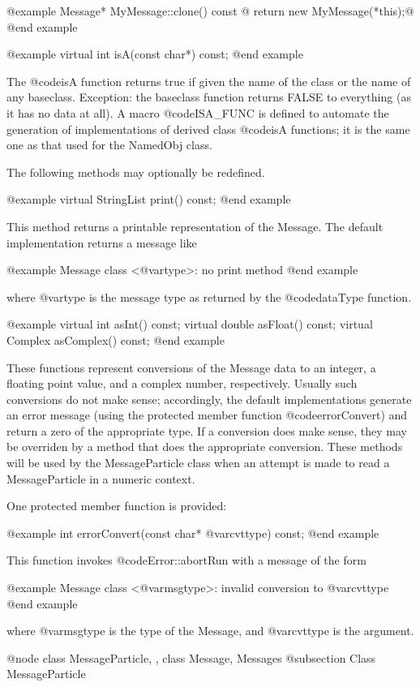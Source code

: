 @example
Message* MyMessage::clone() const @{ return new MyMessage(*this);@}
@end example

@example
virtual int isA(const char*) const;
@end example

The @code{isA} function returns true if given the name of the class
or the name of any baseclass.  Exception: the baseclass function returns
FALSE to everything (as it has no data at all).  A macro @code{ISA_FUNC}
is defined to automate the generation of implementations of derived
class @code{isA} functions; it is the same one as that used for the
NamedObj class.

The following methods may optionally be redefined.

@example
virtual StringList print() const;
@end example

This method returns a printable representation of the Message.
The default implementation returns a message like

@example
Message class <@var{type}>: no print method
@end example

where @var{type} is the message type as returned by the @code{dataType}
function.

@example
virtual int asInt() const;
virtual double asFloat() const;
virtual Complex asComplex() const;
@end example

These functions represent conversions of the Message data to an integer,
a floating point value, and a complex number, respectively.  Usually
such conversions do not make sense; accordingly, the default
implementations generate an error message (using the protected member
function @code{errorConvert}) and return a zero of the appropriate type.
If a conversion does make sense, they may be overriden by a method that
does the appropriate conversion.  These methods will be used by the
MessageParticle class when an attempt is made to read a MessageParticle
in a numeric context.

One protected member function is provided:

@example
int errorConvert(const char* @var{cvttype}) const;
@end example

This function invokes @code{Error::abortRun} with a message of the
form

@example
Message class <@var{msgtype}>: invalid conversion to @var{cvttype}
@end example

where @var{msgtype} is the type of the Message, and @var{cvttype} is
the argument.

@node class MessageParticle,  , class Message, Messages
@subsection Class MessageParticle

